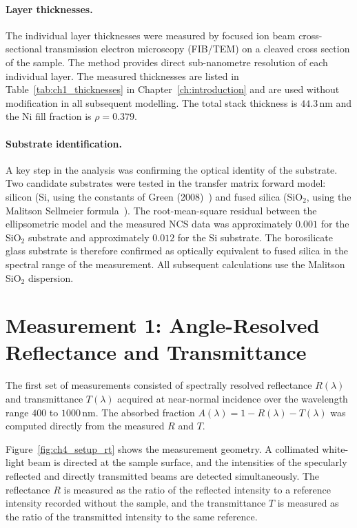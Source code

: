 \paragraph{Layer thicknesses.}
The individual layer thicknesses were measured by focused ion beam
cross-sectional transmission electron microscopy (FIB/TEM) on a cleaved cross
section of the sample. The method provides direct sub-nanometre resolution of
each individual layer. The measured thicknesses are listed in
Table~\ref{tab:ch1_thicknesses} in Chapter~\ref{ch:introduction} and are used
without modification in all subsequent modelling. The total stack thickness is
$44.3$\,nm and the Ni fill fraction is $\rho = 0.379$.

\paragraph{Substrate identification.}
A key step in the analysis was confirming the optical identity of the substrate.
Two candidate substrates were tested in the transfer matrix forward model:
silicon (Si, using the constants of Green (2008)~\cite{green2008}) and fused
silica (SiO$_2$, using the Malitson Sellmeier formula~\cite{malitson}). The
root-mean-square residual between the ellipsometric model and the measured NCS
data was approximately $0.001$ for the SiO$_2$ substrate and approximately
$0.012$ for the Si substrate. The borosilicate glass substrate is therefore
confirmed as optically equivalent to fused silica in the spectral range of the
measurement. All subsequent calculations use the Malitson SiO$_2$ dispersion.

\section{Measurement 1: Angle-Resolved Reflectance and Transmittance}

The first set of measurements consisted of spectrally resolved reflectance
$R(\lambda)$ and transmittance $T(\lambda)$ acquired at near-normal incidence
over the wavelength range $400$ to $1000$\,nm. The absorbed fraction
$A(\lambda) = 1 - R(\lambda) - T(\lambda)$ was computed directly from the
measured $R$ and $T$.

Figure~\ref{fig:ch4_setup_rt} shows the measurement geometry. A collimated
white-light beam is directed at the sample surface, and the intensities of the
specularly reflected and directly transmitted beams are detected simultaneously.
The reflectance $R$ is measured as the ratio of the reflected intensity to a
reference intensity recorded without the sample, and the transmittance $T$
is measured as the ratio of the transmitted intensity to the same reference.

